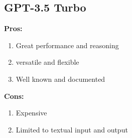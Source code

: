 \documentclass[11pt,a4paper]{article}
\begin{document}
\subsection{GPT-3.5 Turbo}

\textbf{Pros:}
\begin{enumerate}[label*=\arabic*.]
    \item [\textbullet] Great performance and reasoning
	\item [\textbullet] versatile and flexible
	\item[\textbullet] Well known and documented
\end{enumerate}

\textbf{Cons:}
\begin{enumerate}[label*=\arabic*.]
	\item[\textbullet] Expensive	
	\item[\textbullet] Limited to textual input and output
\end{enumerate}
\end{document}

